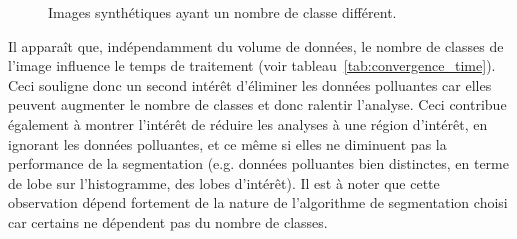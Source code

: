 	\begin{figure}[!ht]	%
	  \centering
				\hspace{2em}
				\hspace{2em}
				\hspace{2em}
		  \caption{Images synthétiques ayant un nombre de classe différent.}
		  \label{fig:apl_1_0}
	\end{figure}
	
	Il apparaît que, indépendamment du volume de données, le nombre de classes de l'image influence le temps de traitement (voir tableau~\ref{tab:convergence_time}). Ceci souligne donc un second intérêt d'éliminer les données polluantes car elles peuvent augmenter le nombre de classes et donc ralentir l'analyse. Ceci contribue également à montrer l'intérêt de réduire les analyses à une région d'intérêt, en ignorant les données polluantes, et ce même si elles ne diminuent pas la performance de la segmentation (e.g. données polluantes bien distinctes, en terme de lobe sur l'histogramme, des  lobes d'intérêt). Il est à noter que cette observation dépend fortement de la nature de l'algorithme de segmentation choisi car certains ne dépendent pas du nombre de classes.


